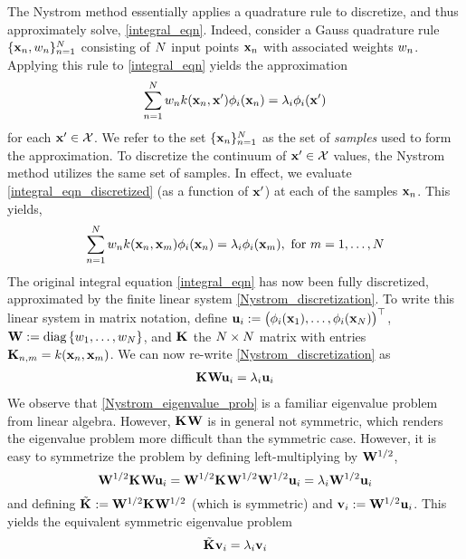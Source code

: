 \documentclass[12pt]{article}
\begin{document}
The Nystrom method essentially applies 
a quadrature rule to discretize, and thus approximately solve, \ref{integral_eqn}. Indeed, consider a Gauss quadrature rule 
$\{\bx_{\designIdx}, w_{\designIdx}\}_{\designIdx = 1}^{\Ndesign}$ consisting of $\Ndesign$ input points $\bx_{\designIdx}$ with associated weights $w_{\designIdx}$.
Applying this rule to \ref{integral_eqn} yields the approximation 
\begin{align}
\sum_{\designIdx = 1}^{\Ndesign} w_{\designIdx} \GPKer(\bx_{\designIdx}, \bx^\prime) \phi_i(\bx_{\designIdx}) = \lambda_i \phi_i(\bx^\prime) \label{integral_eqn_discretized}
\end{align}
for each $\bx^\prime \in \inputSpace$. We refer to the set $\{\bx_{\designIdx}\}_{\designIdx = 1}^{\Ndesign}$ as the set of \textit{samples} used to form the approximation. 
To discretize the continuum of $\bx^\prime \in \inputSpace$ values, the Nystrom method utilizes the same set of samples. In effect, we evaluate \ref{integral_eqn_discretized}
(as a function of $\bx^\prime$) at each of the samples $\bx_{\designIdx}$. This yields, 
\begin{align}
\sum_{\designIdx = 1}^{\Ndesign} w_{\designIdx}  \GPKer(\bx_{\designIdx}, \bx_m) \phi_i(\bx_{\designIdx}) = \lambda_i \phi_i(\bx_m), \text{ for } m = 1, \dots, \Ndesign \label{Nystrom_discretization}
\end{align}
The original integral equation \ref{integral_eqn} has now been fully discretized, approximated by the finite linear system \ref{Nystrom_discretization}. To write this linear system in 
matrix notation, define $\bu_i := \begin{pmatrix} \phi_i(\bx_1), \dots, \phi_i(\bx_N) \end{pmatrix}^{\top}$, $\bW := \text{diag}\left\{w_1, \dots, w_{\Ndesign} \right\}$, and 
$\kerMat$ the $\Ndesign \times \Ndesign$ matrix with entries $\kerMat[\designIdx, m] = \GPKer(\bx_{\designIdx}, \bx_m)$. We can now re-write \ref{Nystrom_discretization} as 
\begin{align}
\kerMat \bW \bu_i = \lambda_i \bu_i \label{Nystrom_eigenvalue_prob}
\end{align}
We observe that \ref{Nystrom_eigenvalue_prob} is a familiar eigenvalue problem from linear algebra. However, $\kerMat \bW$ is in general not symmetric, which renders the 
eigenvalue problem more difficult than the symmetric case. However, it is easy to symmetrize the problem by defining left-multiplying by $\bW^{1/2}$,
\[\bW^{1/2} \kerMat \bW \bu_i = \bW^{1/2} \kerMat \bW^{1/2} \bW^{1/2} \bu_i= \lambda_i \bW^{1/2} \bu_i\]
and defining $\tilde{\kerMat} := \bW^{1/2} \kerMat \bW^{1/2}$ (which is symmetric) and $\bv_i := \bW^{1/2} \bu_i$. This yields the equivalent symmetric eigenvalue problem 
\begin{align}
\tilde{\kerMat} \bv_i = \lambda_i \bv_i
\end{align}
\end{document}
